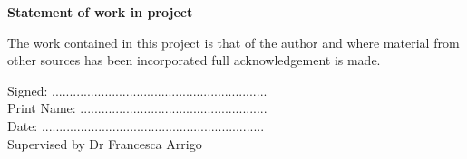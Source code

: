 
\vspace*{1cm}
\begin{center}
\textbf{\Large{Statement of work in project}}
\end{center}

\normalsize

The work contained in this project is that of the author and where
material from other sources has been incorporated full acknowledgement
is made.

\vspace{1cm}

Signed: .............................................................\\

Print Name: .....................................................\\

Date: ...............................................................\\


Supervised by Dr Francesca Arrigo